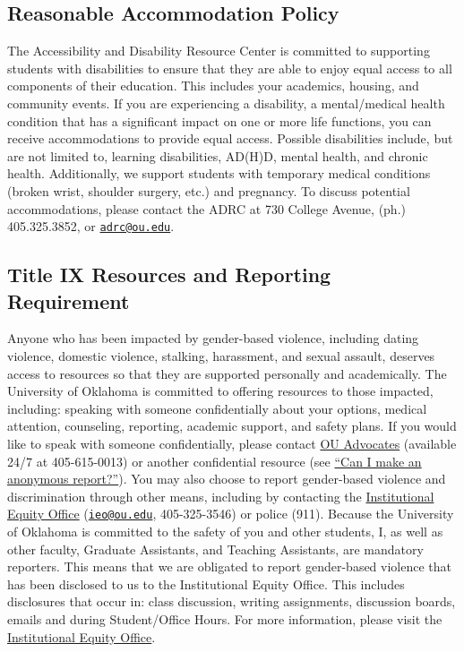 \documentclass[11pt,english]{article}
\begin{document}
\subsection*{Reasonable Accommodation Policy}

The Accessibility and Disability Resource Center is committed to supporting students with disabilities to ensure that they are able to enjoy equal access to all components of their education.  This includes your academics, housing, and community events.  If you are experiencing a disability, a mental/medical health condition that has a significant impact on one or more life functions, you can receive accommodations to provide equal access.  Possible disabilities include, but are not limited to, learning disabilities, AD(H)D, mental health, and chronic health.  Additionally, we support students with temporary medical conditions (broken wrist, shoulder surgery, etc.) and pregnancy.  To discuss potential accommodations, please contact the ADRC at 730 College Avenue, (ph.) 405.325.3852, or \href{mailto:adrc@ou.edu}{\texttt{adrc@ou.edu}}. 

\subsection*{Title IX Resources and Reporting Requirement}

Anyone who has been impacted by gender-based violence, including dating violence, domestic violence, stalking, harassment, and sexual assault, deserves access to resources so that they are supported personally and academically. The University of Oklahoma is committed to offering resources to those impacted, including: speaking with someone confidentially about your options, medical attention, counseling, reporting, academic support, and safety plans. If you would like to speak with someone confidentially, please contact \href{https://www.ou.edu/gec/gender-based-violence/advocates}{OU Advocates} (available 24/7 at 405-615-0013) or another confidential resource (see \href{https://www.ou.edu/gec/gender-based-violence/learn-more}{``Can I make an anonymous report?''}). You may also choose to report gender-based violence and discrimination through other means, including by contacting the \href{http://www.ou.edu/eoo}{Institutional Equity Office} (\href{mailto:ieo@ou.edu}{\texttt{ieo@ou.edu}}, 405-325-3546) or police (911). Because the University of Oklahoma is committed to the safety of you and other students, I, as well as other faculty, Graduate Assistants, and Teaching Assistants, are mandatory reporters. This means that we are obligated to report gender-based violence that has been disclosed to us to the Institutional Equity Office. This includes disclosures that occur in: class discussion, writing assignments, discussion boards, emails and during Student/Office Hours. For more information, please visit the \href{http://www.ou.edu/eoo}{Institutional Equity Office}.
\end{document}
